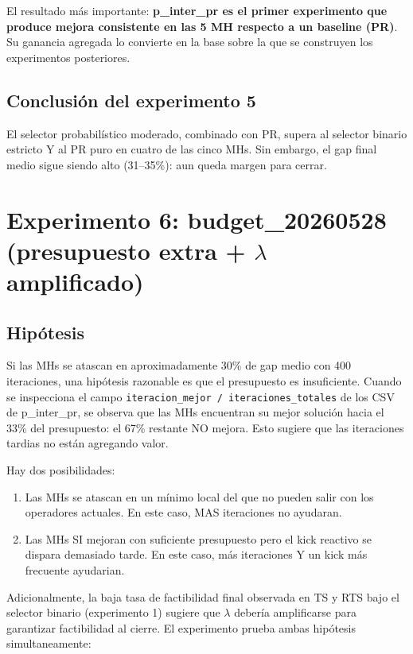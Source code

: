 \documentclass[11pt,a4paper]{article}
\theoremstyle{definition}
\theoremstyle{remark}
\begin{document}
El resultado más importante: \textbf{p\_inter\_pr es el primer
experimento que produce mejora consistente en las 5 MH respecto a un
baseline (PR)}. Su ganancia agregada lo convierte en la base sobre la
que se construyen los experimentos posteriores.

\subsection{Conclusión del experimento 5}

El selector probabilístico moderado, combinado con PR, supera al
selector binario estricto Y al PR puro en cuatro de las cinco MHs.
Sin embargo, el gap final medio sigue siendo alto (31--35\%): aun
queda margen para cerrar.

\section{Experimento 6: budget\_20260528 (presupuesto extra + $\lambda$ amplificado)}
\label{sec:exp-budget}

\subsection{Hipótesis}

Si las MHs se atascan en aproximadamente 30\% de gap medio con 400
iteraciones, una hipótesis razonable es que el presupuesto es
insuficiente. Cuando se inspecciona el campo
\texttt{iteracion\_mejor / iteraciones\_totales} de los CSV de
p\_inter\_pr, se observa que las MHs encuentran su mejor solución
hacia el 33\% del presupuesto: el 67\% restante NO mejora. Esto
sugiere que las iteraciones tardias no están agregando valor.

Hay dos posibilidades:

\begin{enumerate}
\item Las MHs se atascan en un mínimo local del que no pueden salir
  con los operadores actuales. En este caso, MAS iteraciones no
  ayudaran.
\item Las MHs SI mejoran con suficiente presupuesto pero el kick
  reactivo se dispara demasiado tarde. En este caso, más iteraciones
  Y un kick más frecuente ayudarian.
\end{enumerate}

Adicionalmente, la baja tasa de factibilidad final observada en TS y
RTS bajo el selector binario (experimento 1) sugiere que $\lambda$
debería amplificarse para garantizar factibilidad al cierre. El
experimento prueba ambas hipótesis simultaneamente:
\end{document}
